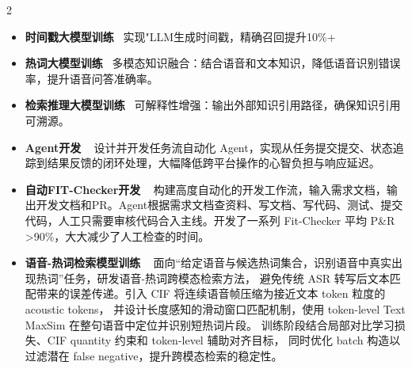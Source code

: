 \documentclass[10pt,a4paper,withhyper,normalphoto]{altacv}
\begin{document}
\begin{paracol}{2}

\begin{itemize}
\item \textbf{时间戳大模型训练}~ 实现"LLM生成时间戳，精确召回提升10\%+
\item \textbf{热词大模型训练}~ 多模态知识融合：结合语音和文本知识，降低语音识别错误率，提升语音问答准确率。
\item \textbf{检索推理大模型训练}~ 可解释性增强：输出外部知识引用路径，确保知识引用可溯源。
\end{itemize}

\divider

\begin{itemize}
\item \textbf{Agent开发} ~ 设计并开发任务流自动化 Agent，实现从任务提交提交、状态追踪到结果反馈的闭环处理，大幅降低跨平台操作的心智负担与响应延迟。
\item \textbf{自动FIT-Checker开发} ~ 构建高度自动化的开发工作流，输入需求文档，输出开发文档和PR。Agent根据需求文档查资料、写文档、写代码、测试、提交代码，人工只需要审核代码合入主线。开发了一系列 Fit-Checker 平均 P\&R >90\%，大大减少了人工检查的时间。
\end{itemize}

\divider

\begin{itemize}
\item \textbf{语音-热词检索模型训练} ~ 面向“给定语音与候选热词集合，识别语音中真实出现热词”任务，研发语音-热词跨模态检索方法，
避免传统 ASR 转写后文本匹配带来的误差传递。引入 CIF 将连续语音帧压缩为接近文本 token 粒度的 acoustic tokens，
并设计长度感知的滑动窗口匹配机制，使用 token-level Text MaxSim 在整句语音中定位并识别短热词片段。
训练阶段结合局部对比学习损失、CIF quantity 约束和 token-level 辅助对齐目标，
同时优化 batch 构造以过滤潜在 false negative，提升跨模态检索的稳定性。
\end{itemize}





\end{paracol}
\end{document}
